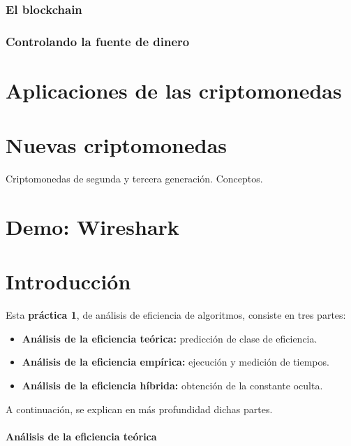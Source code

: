 \documentclass[10pt, a4paper]{article}
\theoremstyle{theorem-style}
\theoremstyle{theorem-style}
\theoremstyle{definition-style}
\theoremstyle{remark-style}
\theoremstyle{example-style}
\theoremstyle{definition-style}
\theoremstyle{remark-style}
\begin{document}
\section{El blockchain}\label{el-blockchain}

\section{Controlando la fuente de
dinero}\label{controlando-la-fuente-de-dinero}

\part{Aplicaciones de las
criptomonedas}\label{aplicaciones-de-las-criptomonedas}

\part{Nuevas criptomonedas}\label{nuevas-criptomonedas}

Criptomonedas de segunda y tercera generación. Conceptos.

\part{Demo: Wireshark}\label{demo-wireshark}



\part{Introducción}

Esta \textbf{práctica 1}, de análisis de eficiencia de algoritmos, consiste en tres partes:

\begin{itemize}
	\item \textbf{Análisis de la eficiencia teórica:} predicción de clase de eficiencia.
	\item \textbf{Análisis de la eficiencia empírica:} ejecución y medición de tiempos.
	\item \textbf{Análisis de la eficiencia híbrida:} obtención de la constante oculta.
\end{itemize}

A continuación, se explican en más profundidad dichas partes.

\subsection*{Análisis de la eficiencia teórica}
\end{document}
